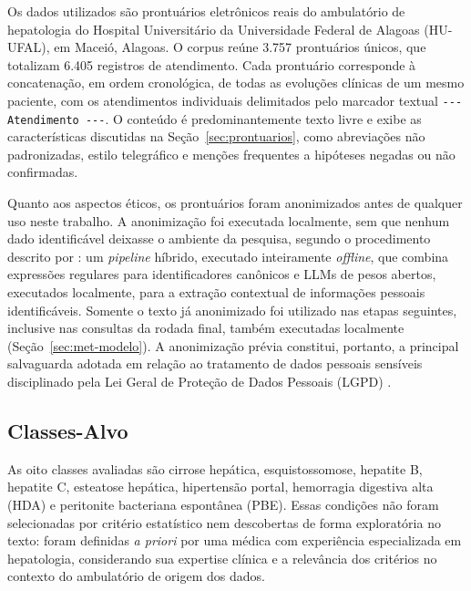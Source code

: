 Os dados utilizados são prontuários eletrônicos reais do ambulatório de hepatologia do Hospital Universitário da Universidade Federal de Alagoas (HU-UFAL), em Maceió, Alagoas.
O corpus reúne 3.757 prontuários únicos, que totalizam 6.405 registros de atendimento. Cada prontuário corresponde à concatenação, em ordem cronológica, de todas as evoluções clínicas de um mesmo paciente, com os atendimentos individuais delimitados pelo marcador textual \texttt{-{}-{}- Atendimento -{}-{}-}. O conteúdo é predominantemente texto livre e exibe as características discutidas na Seção~\ref{sec:prontuarios}, como abreviações não padronizadas, estilo telegráfico e menções frequentes a hipóteses negadas ou não confirmadas.

Quanto aos aspectos éticos, os prontuários foram anonimizados antes de qualquer uso neste trabalho.
A anonimização foi executada localmente, sem que nenhum dado identificável deixasse o ambiente da pesquisa, segundo o procedimento descrito por \citet{aragao2026}: um \textit{pipeline} híbrido, executado inteiramente \textit{offline}, que combina expressões regulares para identificadores canônicos e LLMs de pesos abertos, executados localmente, para a extração contextual de informações pessoais identificáveis. Somente o texto já anonimizado foi utilizado nas etapas seguintes, inclusive nas consultas da rodada final, também executadas localmente (Seção~\ref{sec:met-modelo}). A anonimização prévia constitui, portanto, a principal salvaguarda adotada em relação ao tratamento de dados pessoais sensíveis disciplinado pela Lei Geral de Proteção de Dados Pessoais (LGPD) \citep{brasil2018lgpd}.

\subsection{Classes-Alvo}\label{sec:met-classes}

As oito classes avaliadas são cirrose hepática, esquistossomose, hepatite B, hepatite C, esteatose hepática, hipertensão portal, hemorragia digestiva alta (HDA) e peritonite bacteriana espontânea (PBE). Essas condições não foram selecionadas por critério estatístico nem descobertas de forma exploratória no texto: foram definidas \textit{a priori} por uma médica com experiência especializada em hepatologia, considerando sua expertise clínica e a relevância dos critérios no contexto do ambulatório de origem dos dados.

